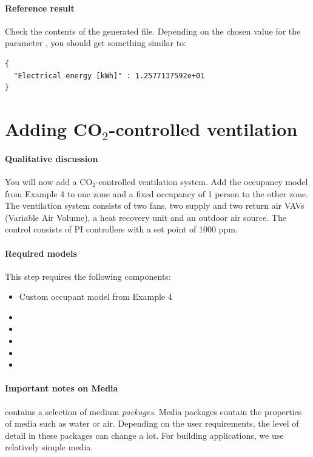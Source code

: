 \documentclass[10pt,a4paper]{article}
\begin{document}
\paragraph{Reference result}
Check the contents of the generated file. 
Depending on the chosen value for the parameter , 
you should get something similar to:
\begin{verbatim}
{
  "Electrical energy [kWh]" : 1.2577137592e+01
}

\end{verbatim}


\section{Adding CO$_2$-controlled ventilation}
\paragraph{Qualitative discussion}
You will now add a CO$_2$-controlled ventilation system.
Add the occupancy model from Example 4 to one zone
and a fixed occupancy of 1 person to the other zone.
The ventilation system consists of two fans, two supply and two return air
VAVs (Variable Air Volume), a heat recovery unit and an outdoor air source.
The control consists of PI controllers with a set point of 1000 ppm.


\paragraph{Required models}
This step requires the following components:
\begin{itemize}
\item Custom occupant model from Example 4
\item {}
\item {}
\item {}
\item {}
\item {}
\end{itemize}


\paragraph{Important notes on Media}
 contains a selection of medium \textit{packages}. 
Media packages contain the properties of media such as water or air.
Depending on the user requirements, the level of detail in these packages can change a lot.
For building applications, we use relatively simple media.
\end{document}
